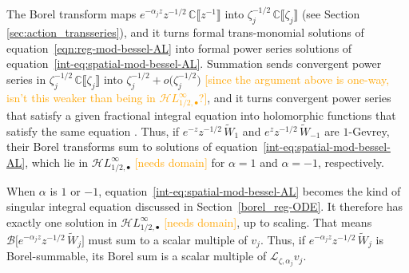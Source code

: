 \documentclass{article}
\newcommand{\singexp}[2]{\mathcal{H}L^\infty_{#1, #2}}
\newcommand{\singexpalg}[1]{\singexp{#1}{\bullet}}
\newcommand{\C}{\mathbb{C}}
\newcommand{\laplace}{\mathcal{L}}
\newcommand{\borel}{\mathcal{B}}
\theoremstyle{definition}
\theoremstyle{plain}
\begin{document}
The Borel transform maps $e^{-\alpha_j z} z^{-1/2}\,\C\llbracket z^{-1} \rrbracket$ into $\zeta_j^{-1/2}\,\C\llbracket \zeta_j \rrbracket$ (see Section \ref{sec:action_transseries}), and it turns formal trans-monomial solutions of equation~\eqref{eqn:reg-mod-bessel-AL} into formal power series solutions of equation~\eqref{int-eq:spatial-mod-bessel-AL}. Summation sends convergent power series in $\zeta_j^{-1/2}\,\C\llbracket \zeta_j \rrbracket$ into $\zeta_j^{-1/2}+ o\big(\zeta_j^{-1/2}\big)$ \textcolor{orange}{[since the argument above is one-way, isn't this weaker than being in $\singexpalg{1/2}$?]}, and it turns convergent power series that satisfy a given fractional integral equation into holomorphic functions that satisfy the same equation \cite[Lemma 2]{reg-sing-volterra}. Thus, if $e^{-z} z^{-1/2}\,\tilde{W}_1$ and $e^z z^{-1/2}\,\tilde{W}_{-1}$ are $1$-Gevrey, their Borel transforms sum to solutions of equation~\eqref{int-eq:spatial-mod-bessel-AL}, which lie in $\singexpalg{1/2}$ \textcolor{orange}{[needs domain]} for $\alpha = 1$ and $\alpha = -1$, respectively.

When $\alpha$ is $1$ or $-1$, equation~\eqref{int-eq:spatial-mod-bessel-AL} becomes the kind of singular integral equation discussed in Section~\ref{borel_reg-ODE}. It therefore has exactly one solution in $\singexpalg{1/2}$ \textcolor{orange}{[needs domain]}, up to scaling. That means $\borel\big[ e^{-\alpha_j z} z^{-1/2}\,\tilde{W}_j \big]$ must sum to a scalar multiple of $v_j$. Thus, if $e^{-\alpha_j z} z^{-1/2}\,\tilde{W}_j$ is Borel-summable, its Borel sum is a scalar multiple of $\laplace_{\zeta, \alpha_j} v_j$.
\end{document}
